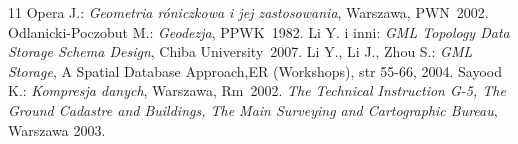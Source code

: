 \begin {thebibliography}{11}
 Opera J.: \emph{Geometria róniczkowa i jej zastosowania}, Warszawa, PWN~2002.
 Odlanicki-Poczobut M.: \emph{Geodezja}, PPWK~1982.
Li Y. i inni: \emph{GML Topology Data Storage Schema Design}, Chiba University~2007.
Li Y., Li J., Zhou S.: \emph{GML Storage}, A Spatial Database Approach,ER (Workshops), str 55-66, 2004.
 Sayood K.: \emph{Kompresja danych}, Warszawa, Rm~2002.
 \emph{The Technical Instruction G-5, The Ground Cadastre and Buildings, The Main Surveying and
Cartographic Bureau}, Warszawa 2003.



\end {thebibliography}


\listoffigures

